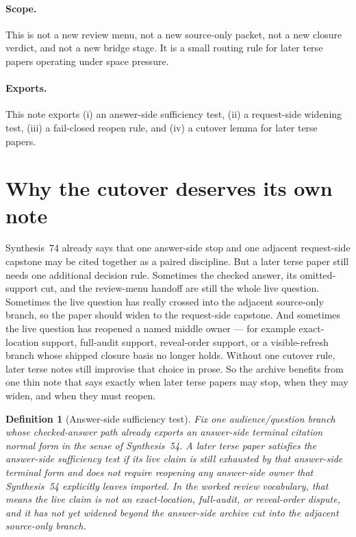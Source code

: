 \documentclass[11pt]{article}
\newtheorem{definition}{Definition}
\begin{document}
\paragraph{Scope.}
This is not a new review menu, not a new source-only packet, not a new closure verdict, and not a new bridge stage.
It is a small routing rule for later terse papers operating under space pressure.

\paragraph{Exports.}
This note exports (i) an answer-side sufficiency test, (ii) a request-side widening test, (iii) a fail-closed reopen rule, and (iv) a cutover lemma for later terse papers.

\section{Why the cutover deserves its own note}
Synthesis~74 already says that one answer-side stop and one adjacent request-side capstone may be cited together as a paired discipline.
But a later terse paper still needs one additional decision rule.
Sometimes the checked answer, its omitted-support cut, and the review-menu handoff are still the whole live question.
Sometimes the live question has really crossed into the adjacent source-only branch, so the paper should widen to the request-side capstone.
And sometimes the live question has reopened a named middle owner --- for example exact-location support, full-audit support, reveal-order support, or a visible-refresh branch whose shipped closure basis no longer holds.
Without one cutover rule, later terse notes still improvise that choice in prose.
So the archive benefits from one thin note that says exactly when later terse papers may stop, when they may widen, and when they must reopen.

\begin{definition}[Answer-side sufficiency test]
Fix one audience/question branch whose checked-answer path already exports an answer-side terminal citation normal form in the sense of Synthesis~54.
A later terse paper satisfies the \emph{answer-side sufficiency test} if its live claim is still exhausted by that answer-side terminal form and does not require reopening any answer-side owner that Synthesis~54 explicitly leaves imported.
In the worked review vocabulary, that means the live claim is \emph{not} an \textsf{exact-location}, \textsf{full-audit}, or \textsf{reveal-order} dispute, and it has not yet widened beyond the answer-side archive cut into the adjacent source-only branch.
\end{definition}
\end{document}
